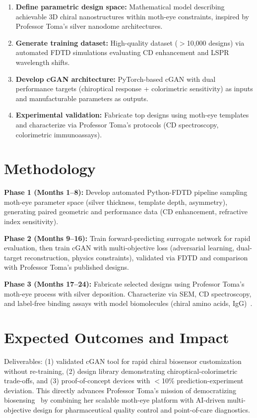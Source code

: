 \documentclass[11pt,a4paper]{article}
\begin{document}
\begin{enumerate}
    \setlength{\itemsep}{0.5pt}
    \setlength{\parskip}{0pt}
  \item \textbf{Define parametric design space:} Mathematical model describing achievable 3D chiral nanostructures within moth-eye constraints, inspired by Professor Toma's silver nanodome architectures.
  \item \textbf{Generate training dataset:} High-quality dataset ($>$10,000 designs) via automated FDTD simulations evaluating CD enhancement and LSPR wavelength shifts.
  \item \textbf{Develop cGAN architecture:} PyTorch-based cGAN with dual performance targets (chiroptical response + colorimetric sensitivity) as inputs and manufacturable parameters as outputs.
  \item \textbf{Experimental validation:} Fabricate top designs using moth-eye templates and characterize via Professor Toma's protocols (CD spectroscopy, colorimetric immunoassays).
\end{enumerate}

\section*{Methodology}
\textbf{Phase 1 (Months 1--8):} Develop automated Python-FDTD pipeline sampling moth-eye parameter space (silver thickness, template depth, asymmetry), generating paired geometric and performance data (CD enhancement, refractive index sensitivity).

\textbf{Phase 2 (Months 9--16):} Train forward-predicting surrogate network for rapid evaluation, then train cGAN with multi-objective loss (adversarial learning, dual-target reconstruction, physics constraints), validated via FDTD and comparison with Professor Toma's published designs.

\textbf{Phase 3 (Months 17--24):} Fabricate selected designs using Professor Toma's moth-eye process with silver deposition. Characterize via SEM, CD spectroscopy, and label-free binding assays with model biomolecules (chiral amino acids, IgG)~\cite{toma_plasmonic_metasurface,toma_enhanced_fluorescence}.

\section*{Expected Outcomes and Impact}
Deliverables: (1) validated cGAN tool for rapid chiral biosensor customization without re-training, (2) design library demonstrating chiroptical-colorimetric trade-offs, and (3) proof-of-concept devices with $<$10\% prediction-experiment deviation. This directly advances Professor Toma's mission of democratizing biosensing~\cite{toma_achievements} by combining her scalable moth-eye platform with AI-driven multi-objective design for pharmaceutical quality control and point-of-care diagnostics.

\newpage
\printbibliography[title={References}]
\end{document}
